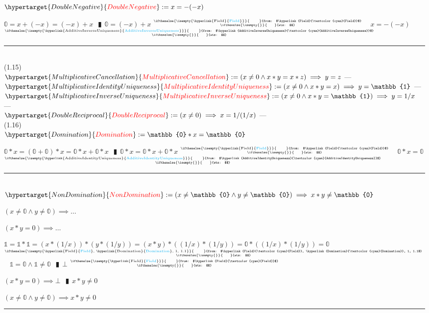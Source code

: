 \documentclass{book}
\newcommand{\df}[1]{\hypertarget{#1}{\textcolor{red}{#1}}}
\newcommand{\rf}[1]{\hyperlink{#1}{\textcolor{cyan}{#1}}}
\newcommand{\abr}{:=}
\newcommand{\pipe}{$\phantom{(}\vrectangleblack\phantom{)}$}
\newcommand{\ann}[2]{%
  \hfill %
  $\stackrel%
  {\hbox{\tiny{\ifthenelse{\isempty{#1}}%
    {\phantom{from}}%
    {from: $#1$}}}}%
  {\hbox{\tiny{\ifthenelse{\isempty{#2}}%
    {\phantom{wts}}%
    {wts: $#2$}}}}$%
\ }
\begin{document}
$\df{DoubleNegative} \abr x = -(-x)$
\begin{enumerate}
  \lit $\mathbb{0} = x + (-x) = (-x) + x$ \pipe $\mathbb{0} = (-x) + x$    \ann{\rf{Field}}{}
  \lit $x = -(-x)$    \ann{\rf{AdditiveInverseUniqueness}}{}
\end{enumerate} \vspace{.75mm} \hrule \vspace{.75mm} \ \\

(1.15) \\
$\df{MultiplicativeCancellation} \abr (x \neq 0 \land x * y = x * z) \implies y = z$    \phantom{TODO}--- \\
$\df{MultiplicativeIdentityUniqueness} \abr (x \neq 0 \land x * y = x) \implies y = \mathbb{1}$    \phantom{TODO}--- \\
$\df{MultiplicativeInverseUniqueness} \abr (x \neq 0 \land x * y = \mathbb{1}) \implies y = 1/x$    \phantom{TODO}--- \\
$\df{DoubleReciprocal} \abr (x \neq 0) \implies x = 1/(1/x)$    \phantom{TODO}--- \\

(1.16) \\
$\df{Domination} \abr \mathbb{0} * x = \mathbb{0}$
\begin{enumerate}
  \lit $\mathbb{0} * x = (\mathbb{0} + \mathbb{0}) * x = \mathbb{0} * x + \mathbb{0} * x$ \pipe $\mathbb{0} * x =  \mathbb{0} * x + \mathbb{0} * x$    \ann{\rf{Field}}{}
  \lit $\mathbb{0} * x = \mathbb{0}$    \ann{\rf{AdditiveIdentityUniqueness}}{}
\end{enumerate} \vspace{.75mm} \hrule \vspace{.75mm} \ \\

$\df{NonDomination} \abr (x \neq \mathbb{0} \land y \neq \mathbb{0}) \implies x * y \neq \mathbb{0}$
\begin{enumerate}
  \lit $(x \neq \mathbb{0} \land y \neq \mathbb{0}) \implies \ldots$
  \begin{enumerate}
    \lit $(x * y = 0) \implies \ldots$
    \begin{enumerate}
      \lit $\mathbb{1} = \mathbb{1} * \mathbb{1} = (x * (1/x)) * (y * (1/y)) = (x * y) * ((1/x) * (1/y)) = \mathbb{0} * ((1/x) * (1/y)) = \mathbb{0}$    \ann{\rf{Field}, \rf{Domination}, 1, 1.1}{}
      \lit $\mathbb{1} = \mathbb{0} \land \mathbb{1} \neq \mathbb{0}$ \pipe $\bot$    \ann{\rf{Field}}{}
    \end{enumerate}
  \lit $(x * y = 0) \implies \bot$ \pipe $x * y \neq 0$
  \end{enumerate}
  \lit $(x \neq \mathbb{0} \land y \neq \mathbb{0}) \implies x * y \neq 0$
\end{enumerate} \vspace{.75mm} \hrule \vspace{.75mm} \ \\
\end{document}
